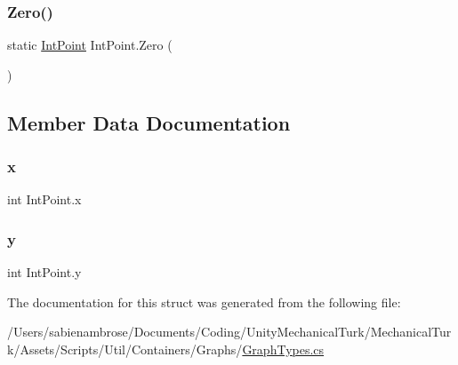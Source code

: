 \subsubsection{\texorpdfstring{Zero()}{Zero()}}
{\footnotesize\ttfamily static \mbox{\hyperlink{struct_int_point}{Int\+Point}} Int\+Point.\+Zero (\begin{DoxyParamCaption}{ }\end{DoxyParamCaption})\hspace{0.3cm}{\ttfamily [static]}}



\subsection{Member Data Documentation}
\mbox{\label{struct_int_point_a939365b5f010e65361371b8ee69c2080}} 
\subsubsection{\texorpdfstring{x}{x}}
{\footnotesize\ttfamily int Int\+Point.\+x}

\mbox{\label{struct_int_point_ac7e0bbc435a90aac2c4136ec83e3f3ef}} 
\subsubsection{\texorpdfstring{y}{y}}
{\footnotesize\ttfamily int Int\+Point.\+y}



The documentation for this struct was generated from the following file\+:\begin{DoxyCompactItemize}
\item 
/\+Users/sabienambrose/\+Documents/\+Coding/\+Unity\+Mechanical\+Turk/\+Mechanical\+Turk/\+Assets/\+Scripts/\+Util/\+Containers/\+Graphs/\mbox{\hyperlink{_graph_types_8cs}{Graph\+Types.\+cs}}\end{DoxyCompactItemize}
